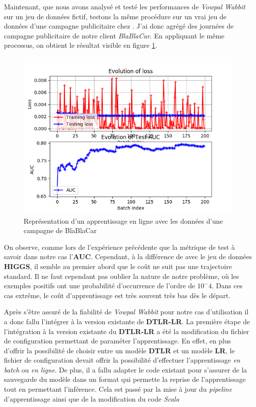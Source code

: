         \par
        Maintenant, que nous avons analysé et testé les performances de \emph{Vowpal Wabbit} sur un jeu de données \fg fictif\og, testons la même procédure sur un vrai jeu de données d'une campagne publicitaire chez \med. J'ai donc agrégé des journées de campagne publicitaire de notre client \emph{BlaBlaCar}. En appliquant le même processus, on obtient le résultat visible en figure \ref{fig:exp_blabla}. 
        \begin{figure}[h]
            \label{fig:exp_blabla}
            \centering
            \includegraphics[scale=0.75]{images/blabla_exp.png}
            \caption{Représentation d'un apprentissage en ligne avec les données d'une campagne de BlaBlaCar}
        \end{figure}
        On observe, comme lors de l'expérience précédente que la métrique de test à savoir dans notre cas l'\textbf{AUC}. Cependant, à la différence de avec le jeu de données \textbf{HIGGS}, il semble au premier abord que le coût ne suit pas une trajectoire standard. Il ne faut cependant pas oublier la nature de notre problème, où les exemples positifs ont une probabilité d'occurrence de l'ordre de $10^-4$. Dans ces cas extrême, le coût d'apprentissage est très souvent très bas dès le départ. \par
        Après s'être assuré de la fiabilité de \emph{Vowpal Wabbit} pour notre cas d'utilisation il a donc fallu l'intégrer à la version existante de \textbf{DTLR-LR}. La première étape de l'intégration à la version existante du \bo \textbf{DTLR-LR} a été la modification du fichier de configuration permettant de paraméter l'apprentissage. En effet, en plus d'offrir la possibilité de choisir entre un modèle \textbf{DTLR} et un modèle \textbf{LR}, le fichier de configuration devait offrir la possibilité d'effectuer l'apprentissage \emph{en batch} ou \emph{en ligne}. De plus, il a fallu adapter le code existant pour s'assurer de la sauvegarde du modèle dans un format qui permette la reprise de l'apprentissage tout en permettant l'inférence. Cela est passé par la mise à jour du \emph{pipeline} d'apprentissage ainsi que de la modification du code \emph{Scala} \par
